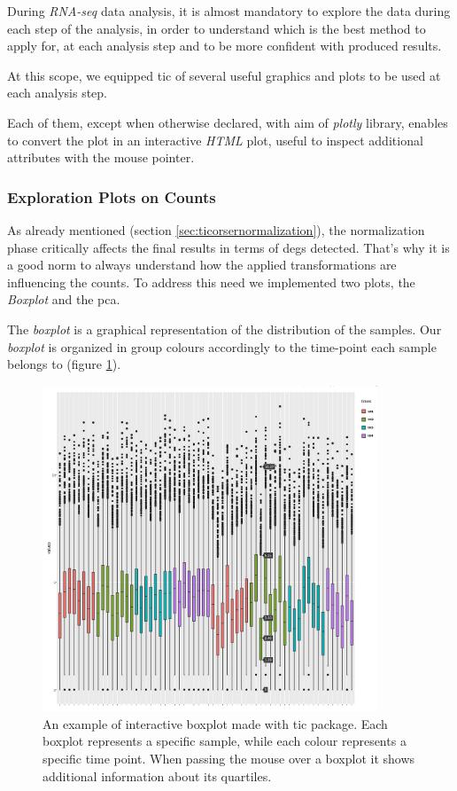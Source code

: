 During \textit{RNA-seq} data analysis, it is almost mandatory to explore the data during each step of the analysis, in order to understand which is the best method to apply for, at each analysis step and to be more confident with produced results. 

At this scope, we equipped \gls{tic} of several useful graphics and plots to be used at each analysis step.

Each of them, except when otherwise declared, with aim of \textit{plotly} library, enables to convert the plot in an interactive \textit{HTML} plot, useful to inspect additional attributes with the mouse pointer.

\subsubsection{Exploration Plots on Counts}
As already mentioned (section \ref{sec:ticorsernormalization}), the normalization phase critically affects the final results in terms of \glspl{deg} detected.
That's why it is a good norm to always understand how the applied transformations are influencing the counts. 
To address this need we implemented two plots, the \textit{Boxplot} and the \gls{pca}.

The \textit{boxplot} is a graphical representation of the distribution of the samples. 
Our \textit{boxplot} is organized in group colours accordingly to the time-point each sample belongs to (figure \ref{fig:ticorserboxplot}).

\begin{figure}[H]
\centering
\includegraphics[width=10cm, keepaspectratio]{img/ticorser/boxplot_example.png}
\caption[ticorser boxplot]{An example of interactive boxplot made with \gls{tic} package. Each boxplot represents a specific sample, while each colour represents a specific time point. When passing the mouse over a boxplot it shows additional information about its quartiles.}
\label{fig:ticorserboxplot}
\end{figure}

